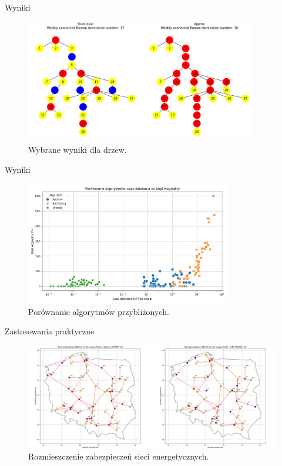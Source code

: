 \documentclass[polish,aspectratio=169]{beamer}
\begin{document}
\begin{frame}{Wyniki}
    \begin{figure}
        \centering
        \includegraphics[width=0.9\textwidth]{images/image1.png}
        \caption{Wybrane wyniki dla drzew.}
    \end{figure}    
\end{frame}

\begin{frame}{Wyniki}
    \begin{figure}
        \centering
        \includegraphics[width=0.8\textwidth]{images/alorithms.png}
        \caption{Porównanie algorytmów przybliżonych.}
    \end{figure}    
\end{frame}

\begin{frame}{Zastosowania praktyczne}
    \begin{figure}
        \centering
        \includegraphics[width=1\textwidth]{images/image.png}
        \caption{Rozmieszczenie zabezpieczeń sieci energetycznych.}
    \end{figure}    
\end{frame}
\end{document}
